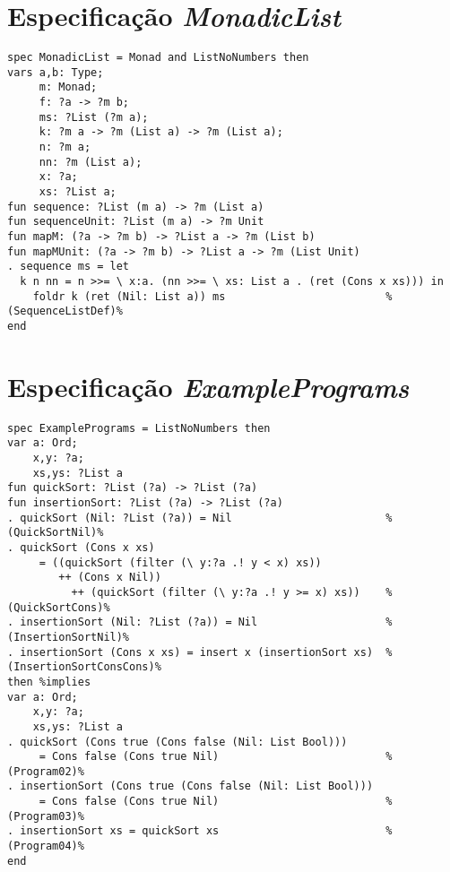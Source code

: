 \section{Especificação \textit{MonadicList}}
\label{appendix:lazySpec:monadicList}
\begin{Verbatim}
spec MonadicList = Monad and ListNoNumbers then
vars a,b: Type;
     m: Monad;
     f: ?a -> ?m b;
     ms: ?List (?m a);
     k: ?m a -> ?m (List a) -> ?m (List a);
     n: ?m a;
     nn: ?m (List a);
     x: ?a;
     xs: ?List a;
fun sequence: ?List (m a) -> ?m (List a)
fun sequenceUnit: ?List (m a) -> ?m Unit
fun mapM: (?a -> ?m b) -> ?List a -> ?m (List b)
fun mapMUnit: (?a -> ?m b) -> ?List a -> ?m (List Unit)
. sequence ms = let
  k n nn = n >>= \ x:a. (nn >>= \ xs: List a . (ret (Cons x xs))) in
    foldr k (ret (Nil: List a)) ms                         %(SequenceListDef)%
end
\end{Verbatim}

\section{Especificação \textit{ExamplePrograms}}
\label{appendix:lazySpec:examplePrograms}
\begin{Verbatim}
spec ExamplePrograms = ListNoNumbers then
var a: Ord;
    x,y: ?a;
    xs,ys: ?List a
fun quickSort: ?List (?a) -> ?List (?a)
fun insertionSort: ?List (?a) -> ?List (?a)
. quickSort (Nil: ?List (?a)) = Nil                        %(QuickSortNil)%
. quickSort (Cons x xs) 
     = ((quickSort (filter (\ y:?a .! y < x) xs)) 
        ++ (Cons x Nil))
          ++ (quickSort (filter (\ y:?a .! y >= x) xs))    %(QuickSortCons)%
. insertionSort (Nil: ?List (?a)) = Nil                    %(InsertionSortNil)%
. insertionSort (Cons x xs) = insert x (insertionSort xs)  %(InsertionSortConsCons)%
then %implies
var a: Ord;
    x,y: ?a;
    xs,ys: ?List a
. quickSort (Cons true (Cons false (Nil: List Bool))) 
     = Cons false (Cons true Nil)                          %(Program02)%
. insertionSort (Cons true (Cons false (Nil: List Bool))) 
     = Cons false (Cons true Nil)                          %(Program03)%
. insertionSort xs = quickSort xs                          %(Program04)%
end
\end{Verbatim}

